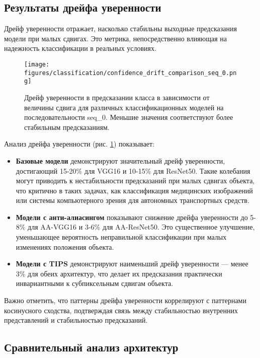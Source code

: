 \subsection{Результаты дрейфа уверенности}
\label{experiments:static:confidence_drift}

Дрейф уверенности отражает, насколько стабильны выходные предсказания модели при малых сдвигах. Это метрика, непосредственно влияющая на надежность классификации в реальных условиях.

\begin{figure}[ht]
\centering
\texttt{[image: figures/classification/confidence\_drift\_comparison\_seq\_0.png]}
\caption{Дрейф уверенности в предсказании класса в зависимости от величины сдвига для различных классификационных моделей на последовательности seq\_0. Меньшие значения соответствуют более стабильным предсказаниям.}
\label{fig:confidence_drift_seq_0}
\end{figure}

Анализ дрейфа уверенности (рис. \ref{fig:confidence_drift_seq_0}) показывает:

\begin{itemize}
    \item \textbf{Базовые модели} демонстрируют значительный дрейф уверенности, достигающий 15-20\% для VGG16 и 10-15\% для ResNet50. Такие колебания могут приводить к нестабильности предсказаний при малых сдвигах объекта, что критично в таких задачах, как классификация медицинских изображений или системы компьютерного зрения для автономных транспортных средств.
    
    \item \textbf{Модели с анти-алиасингом} показывают снижение дрейфа уверенности до 5-8\% для AA-VGG16 и 3-6\% для AA-ResNet50. Это существенное улучшение, уменьшающее вероятность неправильной классификации при малых изменениях положения объекта.
    
    \item \textbf{Модели с TIPS} демонстрируют наименьший дрейф уверенности — менее 3\% для обеих архитектур, что делает их предсказания практически инвариантными к субпиксельным сдвигам объекта.
\end{itemize}

Важно отметить, что паттерны дрейфа уверенности коррелируют с паттернами косинусного сходства, подтверждая связь между стабильностью внутренних представлений и стабильностью предсказаний.

\subsection{Сравнительный анализ архитектур}
\label{experiments:static:comparison}

